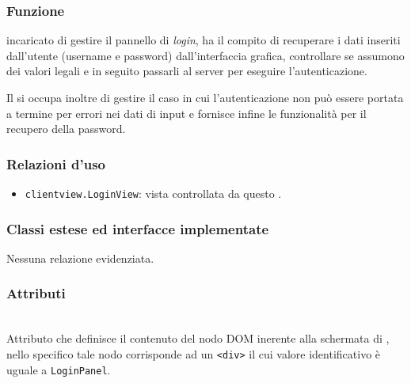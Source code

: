 
\subsubsection*{Funzione}
 incaricato di gestire il pannello di \textit{login}, ha il compito di recuperare i dati inseriti dall'utente (username e password) dall'interfaccia grafica, controllare se assumono dei valori legali e in seguito passarli al server per eseguire l'autenticazione.

Il  si occupa inoltre di gestire il caso in cui l'autenticazione non può essere portata a termine per errori nei dati di input e fornisce infine le funzionalità per il recupero della password.

\subsubsection*{Relazioni d'uso}
\begin{itemize}
  \item \texttt{clientview.LoginView}: vista controllata da questo .
\end{itemize}

\subsubsection*{Classi estese ed interfacce implementate}
Nessuna relazione evidenziata.

\subsubsection*{Attributi}
\begin{description}

\item{}\\
Attributo che definisce il contenuto del nodo DOM inerente alla schermata di , nello specifico tale nodo corrisponde ad un \verb+<div>+ il cui valore identificativo è uguale a \texttt{LoginPanel}.

\end{description}

